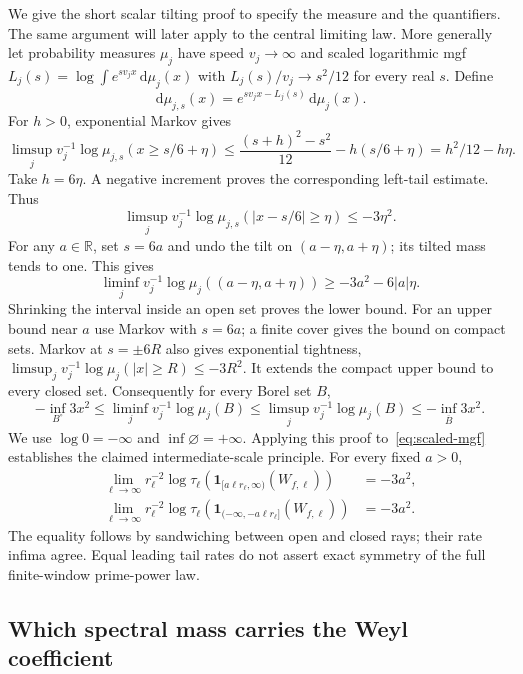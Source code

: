 \documentclass[11pt,reqno]{amsart}
\numberwithin{equation}{section}
\newcommand{\R}{\mathbb R}
\newcommand{\dd}{\,\mathrm d}
\newcommand{\one}{\mathbf 1}
\newcommand{\abs}[1]{\lvert#1\rvert}
\begin{document}
We give the short scalar tilting proof to specify the measure
and the quantifiers. The same argument will later apply to
the central limiting law. More generally let probability measures
$\mu_j$ have speed $v_j\to\infty$ and scaled logarithmic mgf
$L_j(s)=\log\int e^{sv_jx}\dd\mu_j(x)$ with
$L_j(s)/v_j\to s^2/12$ for every real $s$. Define
\[
 \dd\mu_{j,s}(x)=e^{sv_jx-L_j(s)}\dd\mu_j(x).
\]
For $h>0$, exponential Markov gives
\[
 \limsup_j v_j^{-1}\log\mu_{j,s}(x\ge s/6+\eta)
 \le\frac{(s+h)^2-s^2}{12}-h(s/6+\eta)
 =h^2/12-h\eta.
\]
Take $h=6\eta$. A negative increment proves the corresponding
left-tail estimate. Thus
\begin{equation}\label{eq:tilted-concentration}
 \limsup_jv_j^{-1}\log\mu_{j,s}(\abs{x-s/6}\ge\eta)
       \le-3\eta^2.
\end{equation}
For any $a\in\R$, set $s=6a$ and undo the tilt on
$(a-\eta,a+\eta)$; its tilted mass tends to one. This gives
\[
 \liminf_jv_j^{-1}\log\mu_j((a-\eta,a+\eta))
       \ge-3a^2-6\abs a\eta.
\]
Shrinking the interval inside an open set proves the lower bound.
For an upper bound near $a$ use Markov with $s=6a$; a finite
cover gives the bound on compact sets. Markov at $s=\pm6R$
also gives exponential tightness,
$\limsup_jv_j^{-1}\log\mu_j(\abs x\ge R)\le-3R^2$.
It extends the compact upper bound to every closed set.
Consequently for every Borel set $B$,
\begin{equation}\label{eq:LDP}
 -\inf_{B^\circ}3x^2
 \le\liminf_jv_j^{-1}\log\mu_j(B)
 \le\limsup_jv_j^{-1}\log\mu_j(B)
 \le-\inf_{\overline B}3x^2.
\end{equation}
We use $\log0=-\infty$ and $\inf\varnothing=+\infty$.
Applying this proof to~\eqref{eq:scaled-mgf} establishes the
claimed intermediate-scale principle. For every fixed $a>0$,
\begin{equation}\label{eq:moderate-tails}
 \begin{split}
 \lim_{\ell\to\infty}r_\ell^{-2}
   \log\tau_\ell(\one_{[a\ell r_\ell,\infty)}(W_{f,\ell}))&=-3a^2,\\
 \lim_{\ell\to\infty}r_\ell^{-2}
   \log\tau_\ell(\one_{(-\infty,-a\ell r_\ell]}(W_{f,\ell}))&=-3a^2.
 \end{split}
\end{equation}
The equality follows by sandwiching between open and closed rays;
their rate infima agree. Equal leading tail rates do not assert
exact symmetry of the full finite-window prime-power law.

\subsection*{Which spectral mass carries the Weyl coefficient}
\end{document}

